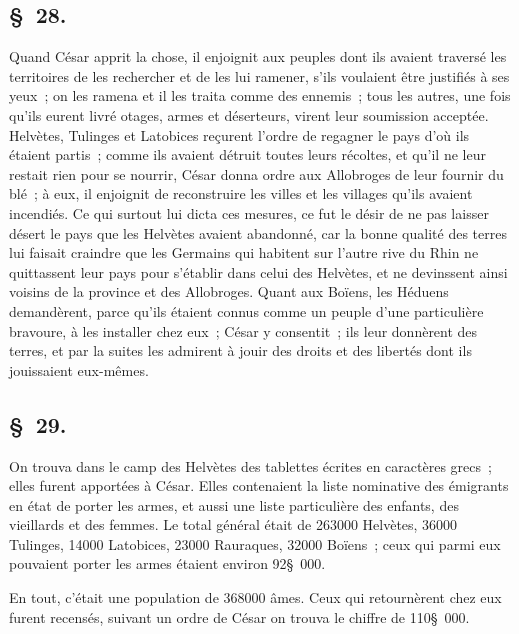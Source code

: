 \documentclass[french,twoside]{book} %
\begin{document}
\subsection[{§ 28.}]{ \textsc{§ 28.} }
\noindent Quand César apprit la chose, il enjoignit aux peuples dont ils avaient traversé les territoires de les rechercher et de les lui ramener, s’ils voulaient être justifiés à ses yeux ; on les ramena et il les traita comme des ennemis ; tous les autres, une fois qu’ils eurent livré otages, armes et déserteurs, virent leur soumission acceptée. Helvètes, Tulinges et Latobices reçurent l’ordre de regagner le pays d’où ils étaient partis ; comme ils avaient détruit toutes leurs récoltes, et qu’il ne leur restait rien pour se nourrir, César donna ordre aux Allobroges de leur fournir du blé ; à eux, il enjoignit de reconstruire les villes et les villages qu’ils avaient incendiés. Ce qui surtout lui dicta ces mesures, ce fut le désir de ne pas laisser désert le pays que les Helvètes avaient abandonné, car la bonne qualité des terres lui faisait craindre que les Germains qui habitent sur l’autre rive du Rhin ne quittassent leur pays pour s’établir dans celui des Helvètes, et ne devinssent ainsi voisins de la province et des Allobroges. Quant aux Boïens, les Héduens demandèrent, parce qu’ils étaient connus comme un peuple d’une particulière bravoure, à les installer chez eux ; César y consentit ; ils leur donnèrent des terres, et par la suites les admirent à jouir des droits et des libertés dont ils jouissaient eux-mêmes.
\subsection[{§ 29.}]{ \textsc{§ 29.} }
\noindent On trouva dans le camp des Helvètes des tablettes écrites en caractères grecs ; elles furent apportées à César. Elles contenaient la liste nominative des émigrants en état de porter les armes, et aussi une liste particulière des enfants, des vieillards et des femmes. Le total général était de 263000 Helvètes, 36000 Tulinges, 14000 Latobices, 23000 Rauraques, 32000 Boïens ; ceux qui parmi eux pouvaient porter les armes étaient environ 92§ 000.\par
En tout, c’était une population de 368000 âmes. Ceux qui retournèrent chez eux furent recensés, suivant un ordre de César on trouva le chiffre de 110§ 000.
\end{document}
